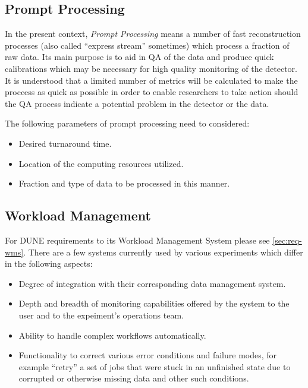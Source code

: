 \subsection{Prompt Processing}
In the present context, \textit{Prompt Processing} means a number of fast reconstruction processes (also called
``express stream'' sometimes) which process a fraction of raw data. Its main purpose is to aid in QA of the data
and produce quick calibrations which may be necessary for high quality monitoring of the detector. It is understood
that a limited number of metrics will be calculated to make the proccess as quick as possible in order to enable
researchers to take action should the QA process indicate a potential problem in the detector or the data.

The following parameters of prompt processing need to considered:
\begin{itemize}
\item Desired turnaround time.
\item Location of the computing resources utilized.
\item Fraction and type of data to be processed in this manner.
\end{itemize}

\subsection{Workload Management}
\label{sec:dune-wms}
For DUNE requirements to its Workload Management System please see \ref{sec:req-wms}. There are a few systems currently used by various experiments which
differ in the following aspects:
\begin{itemize}

\item Degree of integration with their corresponding data management system.

\item Depth and breadth of monitoring capabilities offered by the system to the user and to the expeiment's operations team.

\item Ability to handle complex workflows automatically.

\item Functionality to correct various error conditions and failure modes, for example ``retry'' a set of jobs that were stuck in an unfinished state
due to corrupted or otherwise missing data and other such conditions.

\end{itemize}

